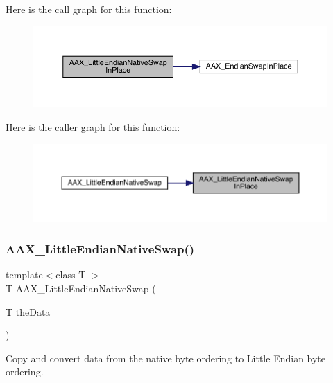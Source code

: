Here is the call graph for this function\+:
\nopagebreak
\begin{figure}[H]
\begin{center}
\leavevmode
\includegraphics[width=350pt]{a00488_af4164bdfb3807edcd582e0289a6ed59a_cgraph}
\end{center}
\end{figure}
Here is the caller graph for this function\+:
\nopagebreak
\begin{figure}[H]
\begin{center}
\leavevmode
\includegraphics[width=350pt]{a00488_af4164bdfb3807edcd582e0289a6ed59a_icgraph}
\end{center}
\end{figure}
\mbox{\label{a00488_a49f57c502ff278b26260b1744da99633}} 
\subsubsection{\texorpdfstring{AAX\_LittleEndianNativeSwap()}{AAX\_LittleEndianNativeSwap()}}
{\footnotesize\ttfamily template$<$class T $>$ \\
T A\+A\+X\+\_\+\+Little\+Endian\+Native\+Swap (\begin{DoxyParamCaption}\item[{T}]{the\+Data }\end{DoxyParamCaption})\hspace{0.3cm}{\ttfamily [inline]}}



Copy and convert data from the native byte ordering to Little Endian byte ordering. 



